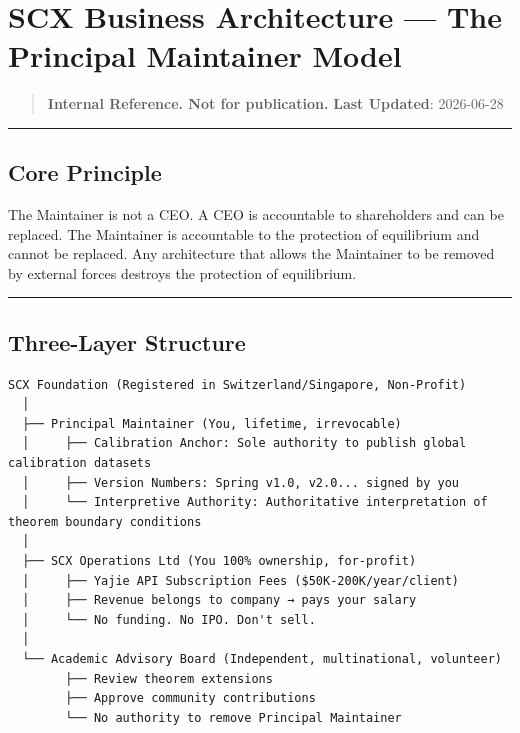 \documentclass[
  12pt,
]{article}
\author{SCX}
\date{2026}
\begin{document}
\section{SCX Business Architecture --- The Principal Maintainer Model}\label{scx-business-architecture}

\begin{quote}
\textbf{Internal Reference. Not for publication.} \textbf{Last Updated}: 2026-06-28
\end{quote}

\begin{center}\rule{0.5\linewidth}{0.5pt}\end{center}

\subsection{Core Principle}\label{core-principle}

The Maintainer is not a CEO. A CEO is accountable to shareholders and can be replaced. The Maintainer is accountable to the protection of equilibrium and cannot be replaced. Any architecture that allows the Maintainer to be removed by external forces destroys the protection of equilibrium.

\begin{center}\rule{0.5\linewidth}{0.5pt}\end{center}

\subsection{Three-Layer Structure}\label{three-layer-structure}

\begin{verbatim}
SCX Foundation (Registered in Switzerland/Singapore, Non-Profit)
  │
  ├── Principal Maintainer (You, lifetime, irrevocable)
  │     ├── Calibration Anchor: Sole authority to publish global calibration datasets
  │     ├── Version Numbers: Spring v1.0, v2.0... signed by you
  │     └── Interpretive Authority: Authoritative interpretation of theorem boundary conditions
  │
  ├── SCX Operations Ltd (You 100% ownership, for-profit)
  │     ├── Yajie API Subscription Fees ($50K-200K/year/client)
  │     ├── Revenue belongs to company → pays your salary
  │     └── No funding. No IPO. Don't sell.
  │
  └── Academic Advisory Board (Independent, multinational, volunteer)
        ├── Review theorem extensions
        ├── Approve community contributions
        └── No authority to remove Principal Maintainer
\end{verbatim}
\end{document}
